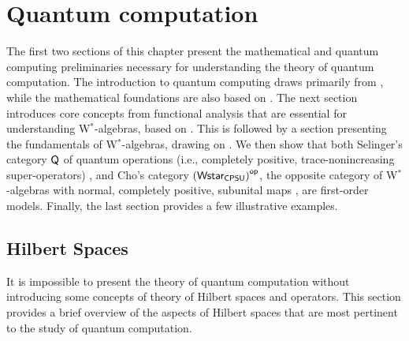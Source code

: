 \chapter{Quantum computation}\label{ch:qc}


The first two sections of this chapter present the mathematical and quantum computing preliminaries necessary for understanding the theory of quantum computation. The introduction to quantum computing draws primarily from \cite{nielsen2010quantum,watrous2018theory}, while the mathematical foundations are also based on \cite{heinosaariMathematicalLanguageQuantum2011,conwayCourseFunctionalAnalysis2007,conwayCourseOperatorTheory2000}.
The next section introduces core concepts from functional analysis that are essential for understanding W$^*$-algebras, based on \cite{rudin91functional,guide2006infinite}. This is followed by a section presenting the fundamentals of W$^*$-algebras, drawing on \cite{sakaiCAlgebrasWAlgebras1998,takesakiTheoryOperatorAlgebras1979,pisierIntroductionOperatorSpace2003}.
We then show that both Selinger’s category 
$\mathsf{Q}$ of quantum operations (i.e., completely positive, trace-nonincreasing super-operators) \cite{selinger2004towards}, and Cho’s category 
$\left(\mathsf{Wstar_{CPSU}}\right)^{\mathsf{op}}$, the opposite category of W$^*$-algebras with normal, completely positive, subunital maps \cite{choSemanticsQuantumProgramming2016}, are first-order models.
Finally, the last section provides a few illustrative examples.




\section{Hilbert Spaces} \label{sec:linalg}



It is impossible to present the theory of quantum computation without introducing some concepts of theory of Hilbert spaces and operators. This section provides a brief overview of the aspects of Hilbert spaces that are most pertinent to the study of quantum computation. 

\begin{center}
\end{center}






